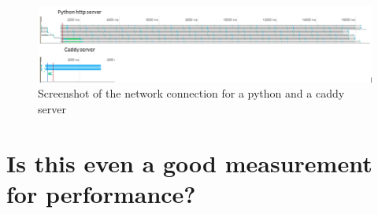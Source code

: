 \begin{figure} [H]
	\centering
	\includegraphics[width=.8\textwidth]{Pictures/CaddyVsPython}
	\caption{Screenshot of the network connection for a python and a caddy server}
	\label{CaddyVsPython}
\end{figure}


 

\section{Is this even a good measurement for performance?}
